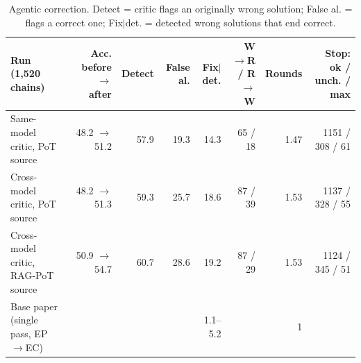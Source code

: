 \begin{table}[t]
\centering
\footnotesize
\caption{Agentic correction. Detect = critic flags an originally wrong solution; False al. = flags a correct one; Fix$|$det. = detected wrong solutions that end correct.}
\label{tab:correction}
\setlength{\tabcolsep}{3.5pt}
\begin{tabular}{lrrrrrrr}
\toprule
Run (1{,}520 chains) & Acc. before $\to$ after & Detect & False al. & Fix$|$det. & W$\to$R / R$\to$W & Rounds & Stop: ok / unch. / max \\
\midrule
Same-model critic, PoT source & 48.2 $\to$ 51.2 & 57.9 & 19.3 & 14.3 & 65 / 18 & 1.47 & 1151 / 308 / 61 \\
Cross-model critic, PoT source & 48.2 $\to$ 51.3 & 59.3 & 25.7 & 18.6 & 87 / 39 & 1.53 & 1137 / 328 / 55 \\
Cross-model critic, RAG-PoT source & 50.9 $\to$ 54.7 & 60.7 & 28.6 & 19.2 & 87 / 29 & 1.53 & 1124 / 345 / 51 \\
Base paper (single pass, EP$\to$EC) &  &  &  & 1.1--5.2 &  & 1 &  \\
\bottomrule
\end{tabular}
\end{table}
